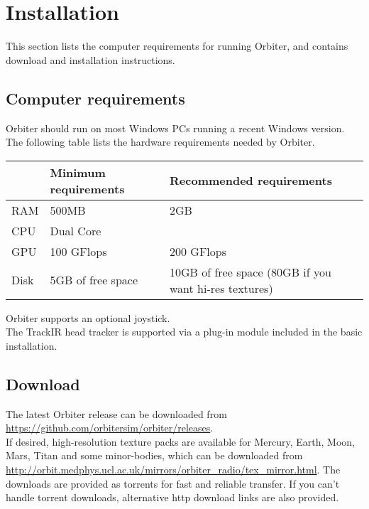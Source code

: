 \documentclass[Orbiter User Manual.tex]{subfiles}
\begin{document}
\section{Installation}
\label{sec:installation}
This section lists the computer requirements for running Orbiter, and contains download and installation instructions.

\subsection{Computer requirements}
Orbiter should run on most Windows PCs running a recent Windows version.\\
The following table lists the hardware requirements needed by Orbiter.

	\begin{longtable}{ |p{}|p{}|p{}| }
	\hline\rule{0pt}{2ex}
	& \textbf{Minimum requirements} & \textbf{Recommended requirements}\\
	\hline\rule{0pt}{2ex}
	RAM & 500MB & 2GB\\
	\hline\rule{0pt}{2ex}
	CPU & Dual Core &\\
	\hline\rule{0pt}{2ex}
	GPU & 100 GFlops & 200 GFlops\\
	\hline\rule{0pt}{2ex}
	Disk & 5GB of free space & 10GB of free space (80GB if you want hi-res textures)\\
	\hline
	\end{longtable}

\noindent
Orbiter supports an optional joystick.\\
The TrackIR head tracker is supported via a plug-in module included in the basic installation.

\subsection{Download}
The latest Orbiter release can be downloaded from \url{https://github.com/orbitersim/orbiter/releases}.\\
If desired, high-resolution texture packs are available for Mercury, Earth, Moon, Mars, Titan and some minor-bodies, which can be downloaded from \url{http://orbit.medphys.ucl.ac.uk/mirrors/orbiter_radio/tex_mirror.html}. The downloads are provided as torrents for fast and reliable transfer. If you can't handle torrent downloads, alternative http download links are also provided.
\end{document}
